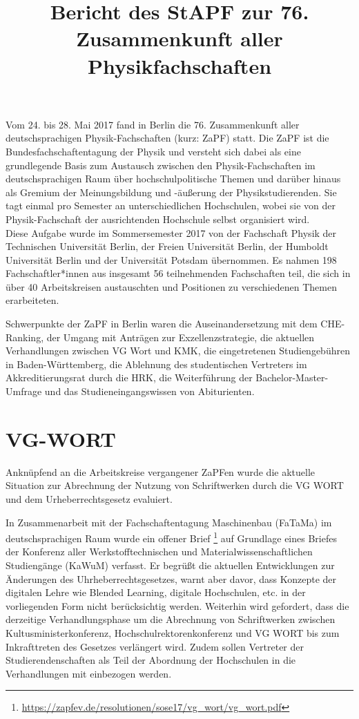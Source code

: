 \documentclass[a4paper]{article}
\begin{document}
	
\title{Bericht des StAPF zur 76. Zusammenkunft aller Physikfachschaften}

\maketitle

Vom 24. bis 28. Mai 2017 fand in Berlin die 76. Zusammenkunft
aller deutschsprachigen Physik-Fachschaften (kurz: ZaPF) statt.  Die ZaPF ist
die Bundesfachschaftentagung der Physik und versteht sich dabei als eine
grundlegende Basis zum Austausch zwischen den Physik-Fachschaften im
deutschsprachigen Raum über hochschulpolitische Themen und darüber hinaus als
Gremium der Meinungsbildung und -äußerung der Physikstudierenden. Sie tagt
einmal pro Semester an unterschiedlichen Hochschulen, wobei sie von der
Physik-Fachschaft der ausrichtenden Hochschule selbst organisiert wird. 
\\

Diese Aufgabe wurde im Sommersemester 2017 von der Fachschaft Physik der Technischen Universität Berlin, der Freien Universität Berlin, der Humboldt Universität Berlin und der Universität Potsdam übernommen. 
Es nahmen 198 Fachschaftler*innen aus insgesamt 56 teilnehmenden Fachschaften teil, 
die sich in über 40 Arbeitskreisen austauschten und Positionen zu verschiedenen Themen erarbeiteten.

Schwerpunkte der ZaPF in Berlin waren die Auseinandersetzung mit dem CHE-Ranking, der Umgang mit Anträgen zur Exzellenzstrategie, die aktuellen Verhandlungen zwischen VG Wort und KMK, die eingetretenen Studiengebühren in Baden-Württemberg, die Ablehnung des studentischen Vertreters im Akkreditierungsrat durch die HRK, 
die Weiterführung der Bachelor-Master-Umfrage und das Studieneingangswissen von Abiturienten.

\newpage

\section*{VG-WORT}
Anknüpfend an die Arbeitskreise vergangener ZaPFen wurde die aktuelle Situation zur Abrechnung der Nutzung von Schriftwerken durch die VG WORT und dem Urheberrechtsgesetz evaluiert. 

In Zusammenarbeit mit der Fachschaftentagung Maschinenbau (FaTaMa) im deutschsprachigen Raum wurde ein offener Brief \footnote{\href{https://zapfev.de/resolutionen/sose17/vg_wort/vg_wort.pdf}{\url{https://zapfev.de/resolutionen/sose17/vg_wort/vg_wort.pdf}}} auf Grundlage eines Briefes der Konferenz aller Werkstofftechnischen und Materialwissenschaftlichen Studiengänge (KaWuM) verfasst. Er begrüßt die aktuellen Entwicklungen zur Änderungen des Uhrheberrechtsgesetzes, warnt aber davor, dass Konzepte der digitalen Lehre wie Blended Learning, digitale Hochschulen, etc. in der vorliegenden Form nicht berücksichtig werden. Weiterhin wird gefordert, dass die derzeitige Verhandlungsphase um die Abrechnung von Schriftwerken zwischen Kultusministerkonferenz, Hochschulrektorenkonferenz und VG WORT bis zum Inkrafttreten des Gesetzes verlängert wird. Zudem sollen Vertreter der Studierendenschaften als Teil der Abordnung der Hochschulen in die Verhandlungen mit einbezogen werden.
\end{document}
